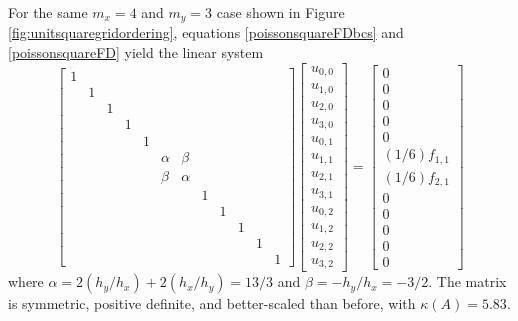 \medskip\noindent\hrulefill
\begin{example} \label{exampleredo} For the same $m_x=4$ and $m_y=3$ case shown in Figure \ref{fig:unitsquaregridordering}, equations \eqref{poissonsquareFDbcs} and \eqref{poissonsquareFD} yield the linear system
\begin{equation*}
\begin{bmatrix}
1 &  &  &  &  &  &  &  &  &  &  &  \\
  & 1&  &  &  &  &  &  &  &  &  &  \\
  &  & 1&  &  &  &  &  &  &  &  &  \\
  &  &  & 1&  &  &  &  &  &  &  &  \\
  &  &  &  & 1&  &  &  &  &  &  &  \\
  &  &  &  &  & \alpha& \beta&  &  &  &  &  \\
  &  &  &  &  & \beta& \alpha&  &  &  &  &  \\
  &  &  &  &  &  &  & 1&  &  &  &  \\
  &  &  &  &  &  &  &  & 1&  &  &  \\
  &  &  &  &  &  &  &  &  & 1&  &  \\
  &  &  &  &  &  &  &  &  &  & 1&  \\
  &  &  &  &  &  &  &  &  &  &  & 1
\end{bmatrix}
\begin{bmatrix}
u_{0,0} \\
u_{1,0} \\
u_{2,0} \\
u_{3,0} \\
u_{0,1} \\
u_{1,1} \\
u_{2,1} \\
u_{3,1} \\
u_{0,2} \\
u_{1,2} \\
u_{2,2} \\
u_{3,2}
\end{bmatrix}
=
\begin{bmatrix}
0 \\
0 \\
0 \\
0 \\
0 \\
(1/6) f_{1,1} \\
(1/6) f_{2,1} \\
0 \\
0 \\
0 \\
0 \\
0
\end{bmatrix}
\end{equation*}
where $\alpha = 2 (h_y/h_x) + 2 (h_x/h_y) = 13/3$ and $\beta = - h_y/h_x = - 3/2$.  The matrix is symmetric, positive definite, and better-scaled than before, with $\kappa(A)=5.83$.

\noindent\hrulefill
\end{example}


